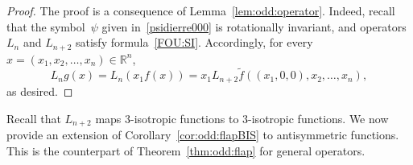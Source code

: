 \documentclass[a4paper,12pt,reqno]{amsart}
\numberwithin{equation}{section}
\theoremstyle{definition}
\theoremstyle{notation}
\newcommand{\R}{\mathds{R}}
\begin{document}
\begin{proof} The proof is a consequence of Lemma~\ref{lem:odd:operator}.
Indeed, recall that the symbol~$\psi$ given in~\eqref{psidierre000}
is rotationally invariant, and operators $L_n$ and $L_{n + 2}$ satisfy formula~\eqref{FOU:SI}.
Accordingly, for every~$x=(x_1,x_2,\dots,x_n)\in\R^n$,
\begin{equation*}
L_ng(x)=L_n(x_1 f(x))=x_1L_{n+2}\tilde f((x_1,0,0),x_2,\dots,x_n),
\end{equation*}
as desired.
\end{proof}


Recall that $L_{n+2}$ maps $3$-isotropic functions to $3$-isotropic functions.
%
We now provide an extension of Corollary~\ref{cor:odd:flapBIS} to antisymmetric functions. This is the counterpart of Theorem~\ref{thm:odd:flap}
for general operators.
\end{document}
